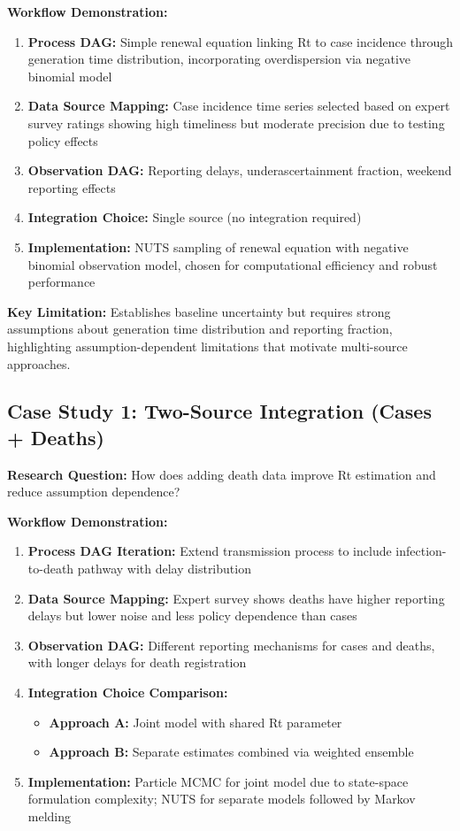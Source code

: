 \documentclass{article}
\begin{document}
\textbf{Workflow Demonstration:}
\begin{enumerate}
    \item \textbf{Process DAG:} Simple renewal equation linking Rt to case incidence through generation time distribution, incorporating overdispersion via negative binomial model
    \item \textbf{Data Source Mapping:} Case incidence time series selected based on expert survey ratings showing high timeliness but moderate precision due to testing policy effects
    \item \textbf{Observation DAG:} Reporting delays, underascertainment fraction, weekend reporting effects
    \item \textbf{Integration Choice:} Single source (no integration required)
    \item \textbf{Implementation:} NUTS sampling of renewal equation with negative binomial observation model, chosen for computational efficiency and robust performance
\end{enumerate}

\textbf{Key Limitation:} Establishes baseline uncertainty but requires strong assumptions about generation time distribution and reporting fraction, highlighting assumption-dependent limitations that motivate multi-source approaches.

\subsection{Case Study 1: Two-Source Integration (Cases + Deaths)}

\textbf{Research Question:} How does adding death data improve Rt estimation and reduce assumption dependence?

\textbf{Workflow Demonstration:}
\begin{enumerate}
    \item \textbf{Process DAG Iteration:} Extend transmission process to include infection-to-death pathway with delay distribution
    \item \textbf{Data Source Mapping:} Expert survey shows deaths have higher reporting delays but lower noise and less policy dependence than cases
    \item \textbf{Observation DAG:} Different reporting mechanisms for cases and deaths, with longer delays for death registration
    \item \textbf{Integration Choice Comparison:} 
        \begin{itemize}
            \item \textbf{Approach A:} Joint model with shared Rt parameter
            \item \textbf{Approach B:} Separate estimates combined via weighted ensemble
        \end{itemize}
    \item \textbf{Implementation:} Particle MCMC for joint model due to state-space formulation complexity; NUTS for separate models followed by Markov melding
\end{enumerate}
\end{document}
